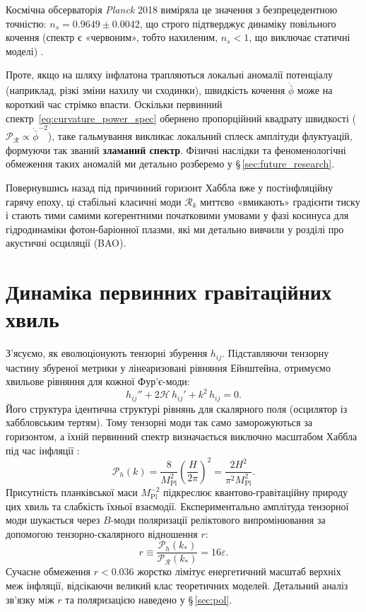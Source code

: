 Космічна обсерваторія \textit{Planck} 2018 виміряла це значення з безпрецедентною точністю: $n_s = 0.9649 \pm 0.0042$, що строго підтверджує динаміку повільного кочення (спектр є «червоним», тобто нахиленим, $n_s < 1$, що виключає статичні моделі) \cite{planck_2018}.

Проте, якщо на шляху інфлатона трапляються локальні аномалії потенціалу (наприклад, різкі зміни нахилу чи сходинки), швидкість кочення $\dot{\bar\phi}$ може на короткий час стрімко впасти. Оскільки первинний спектр~\eqref{eq:curvature_power_spec} обернено пропорційний квадрату швидкості ($\mathcal{P}_{\mathcal{R}} \propto \dot{\bar{\phi}}^{-2}$), таке гальмування викликає локальний сплеск амплітуди флуктуацій, формуючи так званий \textbf{зламаний спектр}. Фізичні наслідки та феноменологічні обмеження таких аномалій ми детально розберемо у §\,\ref{sec:future_research}.

Повернувшись назад під причинний горизонт Хаббла вже у постінфляційну гарячу епоху, ці стабільні класичні моди $\mathcal{R}_k$ миттєво «вмикають» градієнти тиску і стають тими самими когерентними початковими умовами у фазі косинуса для гідродинаміки фотон-баріонної плазми, які ми детально вивчили у розділі про акустичні осциляції (BAO).

\section{Динаміка первинних гравітаційних хвиль}

З'ясуємо, як еволюціонують тензорні збурення $h_{ij}$. Підставляючи тензорну частину збуреної метрики у лінеаризовані рівняння Ейнштейна, отримуємо хвильове рівняння для кожної Фур'є-моди:
\begin{equation}\label{eq:tensor_wave_eq}
  h_{ij}'' + 2\mathcal{H}\,h_{ij}' + k^2\,h_{ij} = 0.
\end{equation}
Його структура ідентична структурі рівнянь для скалярного поля (осцилятор із хаббловським тертям). Тому тензорні моди так само заморожуються за горизонтом, а їхній первинний спектр визначається виключно масштабом Хаббла під час інфляції \cite{starobinsky_1979}:
\begin{equation}\label{eq:tensor_power_spec}
  \mathcal{P}_h(k) = \frac{8}{M_\mathrm{Pl}^2} \left(\frac{H}{2\pi}\right)^{\!2} = \frac{2H^2}{\pi^2 M_\mathrm{Pl}^2}.
\end{equation}
Присутність планківської маси $M_\mathrm{Pl}^{-2}$ підкреслює квантово-гравітаційну природу цих хвиль та слабкість їхньої взаємодії. Експериментально амплітуда тензорної моди шукається через $B$-моди поляризації реліктового випромінювання за допомогою тензорно-скалярного відношення $r$:
\begin{equation}\label{eq:tensor_scalar_ratio}
  r \equiv \frac{\mathcal{P}_h(k_*)}{\mathcal{P}_{\mathcal{R}}(k_*)} = 16\varepsilon.
\end{equation}
Сучасне обмеження $r < 0.036$ \cite{bicep_keck_2021} жорстко лімітує енергетичний масштаб верхніх меж інфляції, відсікаючи великий клас теоретичних моделей. Детальний аналіз зв'язку між $r$ та поляризацією наведено у §\,\ref{sec:pol}.

